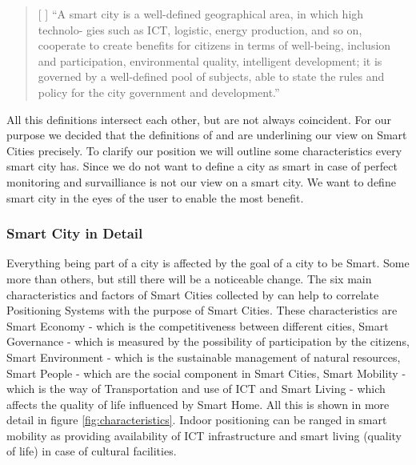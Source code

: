 \begin{quote}[ \textcite{smart9}]
“A smart city is a well-defined geographical area, in which high technolo- gies such as ICT, logistic, energy production, and so on, cooperate to create benefits for citizens in terms of well-being, inclusion and participation, environmental quality, intelligent development; it is governed by a well-defined pool of subjects, able to state the rules and policy for the city government and development.” 
\end{quote}

All this definitions intersect each other, but are not always coincident. For our purpose we decided that the definitions of \textcite{smart9} and \textcite{smart4} are underlining our view on Smart Cities precisely. To clarify our position we will outline some characteristics every smart city has. Since we do not want to define a city as smart in case of perfect monitoring and survailliance \textcite{smart7} is not our view on a smart city. We want to define smart city in the eyes of the user to enable the most benefit.  

\subsubsection{Smart City in Detail}
Everything being part of a city is affected by the goal of a city to be Smart. Some more than others, but still there will be a noticeable change. The six main characteristics and factors of Smart Cities collected by \textcite{smartCharacter} can help to correlate Positioning Systems with the purpose of Smart Cities. These characteristics are Smart Economy - which is the competitiveness between different cities, Smart Governance - which is measured by the possibility of participation by the citizens, Smart Environment - which is the sustainable management of natural resources, Smart People - which are the social component in Smart Cities, Smart Mobility - which is the way of Transportation and use of ICT and Smart Living - which affects the quality of life influenced by Smart Home. All this is shown in more detail in figure \ref{fig:characteristics}. 
Indoor positioning can be ranged in smart mobility as providing availability of ICT infrastructure and smart living (quality of life) in case of cultural facilities. 


